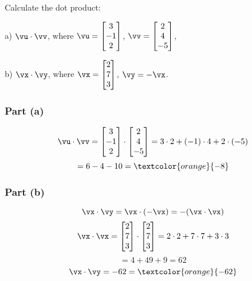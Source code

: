 \begin{problem}%
    Calculate the dot product:
    
a) $\vu \cdot \vv$, where $\vu=\begin{bmatrix}3\\-1\\2 \end{bmatrix}$, $\vv=\begin{bmatrix}2\\4\\-5 \end{bmatrix}$,
\medskip

b) $\vx \cdot \vy$, where $\vx =\begin{bmatrix}2\\7\\3 \end{bmatrix}$, $\vy =-\vx$.
\end{problem}

\begin{sol}
        \subsubsection*{Part (a)}
    \[
    \vu \cdot \vv = \begin{bmatrix} 3 \\ -1 \\ 2 \end{bmatrix} \cdot \begin{bmatrix} 2 \\ 4 \\ -5 \end{bmatrix} = 3 \cdot 2 + (-1) \cdot 4 + 2 \cdot (-5)
    \]
    \[
    = 6 - 4 - 10 = \textcolor{orange}{-8}
    \]
    
    \subsubsection*{Part (b)}
    \[
    \vx \cdot \vy = \vx \cdot (-\vx) = -(\vx \cdot \vx)
    \]
    \[
    \vx \cdot \vx = \begin{bmatrix} 2 \\ 7 \\ 3 \end{bmatrix} \cdot \begin{bmatrix} 2 \\ 7 \\ 3 \end{bmatrix} = 2 \cdot 2 + 7 \cdot 7 + 3 \cdot 3
    \]
    \[
    = 4 + 49 + 9 = 62
    \]
    \[
    \vx \cdot \vy = -62 = \textcolor{orange}{-62}
    \]
\end{sol}



